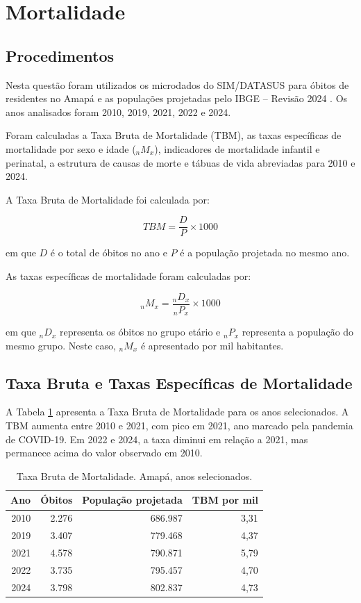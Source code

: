 ﻿\section{Mortalidade}

\subsection{Procedimentos}

Nesta questão foram utilizados os microdados do SIM/DATASUS para óbitos de residentes no Amapá \cite{datasus2026} e as populações projetadas pelo IBGE -- Revisão 2024 \cite{ibge2024}. Os anos analisados foram 2010, 2019, 2021, 2022 e 2024.

Foram calculadas a Taxa Bruta de Mortalidade (TBM), as taxas específicas de mortalidade por sexo e idade (${}_nM_x$), indicadores de mortalidade infantil e perinatal, a estrutura de causas de morte e tábuas de vida abreviadas para 2010 e 2024.

A Taxa Bruta de Mortalidade foi calculada por:

\[
TBM = \frac{D}{P} \times 1000
\]

em que $D$ é o total de óbitos no ano e $P$ é a população projetada no mesmo ano.

As taxas específicas de mortalidade foram calculadas por:

\[
{}_nM_x = \frac{{}_nD_x}{{}_nP_x} \times 1000
\]

em que ${}_nD_x$ representa os óbitos no grupo etário e ${}_nP_x$ representa a população do mesmo grupo. Neste caso, ${}_nM_x$ é apresentado por mil habitantes.

\subsection{Taxa Bruta e Taxas Específicas de Mortalidade}

A Tabela \ref{tab:tbm_q3} apresenta a Taxa Bruta de Mortalidade para os anos selecionados. A TBM aumenta entre 2010 e 2021, com pico em 2021, ano marcado pela pandemia de COVID-19. Em 2022 e 2024, a taxa diminui em relação a 2021, mas permanece acima do valor observado em 2010.

\begin{table}[H]
\centering
\small
\caption{Taxa Bruta de Mortalidade. Amapá, anos selecionados.}
\label{tab:tbm_q3}
\begin{tabular}{rrrr}
\toprule
\textbf{Ano} & \textbf{Óbitos} & \textbf{População projetada} & \textbf{TBM por mil} \\
\midrule
2010 & 2.276 & 686.987 & 3,31 \\
2019 & 3.407 & 779.468 & 4,37 \\
2021 & 4.578 & 790.871 & 5,79 \\
2022 & 3.735 & 795.457 & 4,70 \\
2024 & 3.798 & 802.837 & 4,73 \\
\bottomrule
\end{tabular}
\end{table}

